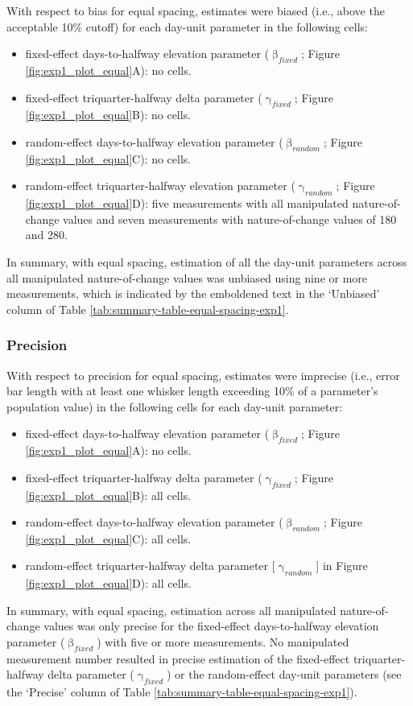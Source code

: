 \documentclass[
12pt, %
twoside,
english]{guelphthesis}
\begin{document}
With respect to bias for equal spacing, estimates were biased (i.e., above the acceptable 10\% cutoff) for each day-unit parameter in the following cells:
\begin{itemize}
\tightlist
\item
  fixed-effect days-to-halfway elevation parameter (\(\upbeta_{fixed}\); Figure \ref{fig:exp1_plot_equal}A): no cells.
\item
  fixed-effect triquarter-halfway delta parameter (\(\upgamma_{fixed}\); Figure \ref{fig:exp1_plot_equal}B): no cells.
\item
  random-effect days-to-halfway elevation parameter (\(\upbeta_{random}\); Figure \ref{fig:exp1_plot_equal}C): no cells.
\item
  random-effect triquarter-halfway elevation parameter (\(\upgamma_{random}\); Figure \ref{fig:exp1_plot_equal}D): five measurements with all manipulated nature-of-change values and seven measurements with nature-of-change values of 180 and 280.
\end{itemize}
In summary, with equal spacing, estimation of all the day-unit parameters across all manipulated nature-of-change values was unbiased using nine or more measurements, which is indicated by the emboldened text in the `Unbiased' column of Table \ref{tab:summary-table-equal-spacing-exp1}.

\hypertarget{precision-equal-exp1}{%
\subsubsection{Precision}\label{precision-equal-exp1}}

With respect to precision for equal spacing, estimates were imprecise (i.e., error bar length with at least one whisker length exceeding 10\% of a parameter's population value) in the following cells for each day-unit parameter:
\begin{itemize}
\tightlist
\item
  fixed-effect days-to-halfway elevation parameter (\(\upbeta_{fixed}\); Figure \ref{fig:exp1_plot_equal}A): no cells.
\item
  fixed-effect triquarter-halfway delta parameter (\(\upgamma_{fixed}\); Figure \ref{fig:exp1_plot_equal}B): all cells.
\item
  random-effect days-to-halfway elevation parameter (\(\upbeta_{random}\); Figure \ref{fig:exp1_plot_equal}C): all cells.
\item
  random-effect triquarter-halfway delta parameter {[}\(\upgamma_{random}\){]} in Figure \ref{fig:exp1_plot_equal}D): all cells.
\end{itemize}
In summary, with equal spacing, estimation across all manipulated nature-of-change values was only precise for the fixed-effect days-to-halfway elevation parameter (\(\upbeta_{fixed}\)) with five or more measurements. No manipulated measurement number resulted in precise estimation of the fixed-effect triquarter-halfway delta parameter (\(\upgamma_{fixed}\)) or the random-effect day-unit parameters (see the `Precise' column of Table \ref{tab:summary-table-equal-spacing-exp1}).
\end{document}
